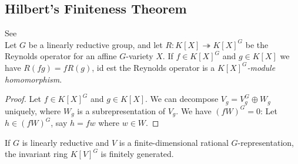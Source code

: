 \subsection{Hilbert's Finiteness Theorem}

\begin{proposition}
  See \cite[p.41 Corollary 2.2.7]{DK15}\\
  Let $G$ be a linearly reductive group, and let $ R \colon K[X] \twoheadrightarrow K[X]^G $ be the Reynolds operator for an affine $G$-variety $X$.
  If $f \in K[X]^G$ and $g \in K[X]$ we have $R(fg) = fR(g)$, id est the Reynolds operator is a \textit{$K[X]^G$-module homomorphism}.
\end{proposition}

\begin{proof}
  Let $f \in K[X]^G$ and $g \in K[X]$.
  We can decompose $V_g = V_g^G \oplus W_g$ uniquely, where $W_g$ is a subrepresentation of $V_g$.
  We have $(fW)^G = {0}$:
  Let $h \in (fW)^G$, say $h = fw$ where $w \in W$.
\end{proof}


\begin{theorem}
  If $G$ is linearly reductive and $V$ is a finite-dimensional rational $G$-representation, the invariant ring $K[V]^G$ is finitely generated.
\end{theorem}


